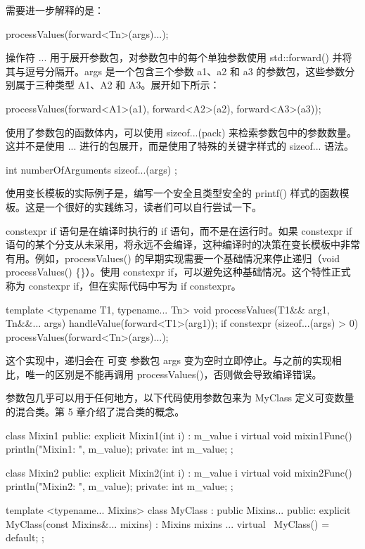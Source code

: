 需要进一步解释的是：

\begin{cpp}
processValues(forward<Tn>(args)...);
\end{cpp}

操作符 ... 用于展开参数包，对参数包中的每个单独参数使用 std::forward() 并将其与逗号分隔开。args 是一个包含三个参数 a1、a2 和 a3 的参数包，这些参数分别属于三种类型 A1、A2 和 A3。展开如下所示：

\begin{cpp}
processValues(forward<A1>(a1),
              forward<A2>(a2),
              forward<A3>(a3));
\end{cpp}

使用了参数包的函数体内，可以使用 sizeof...(pack) 来检索参数包中的参数数量。这并不是使用 ... 进行的包展开，而是使用了特殊的关键字样式的 sizeof... 语法。

\begin{cpp}
int numberOfArguments { sizeof...(args) };
\end{cpp}

使用变长模板的实际例子是，编写一个安全且类型安全的 printf() 样式的函数模板。这是一个很好的实践练习，读者们可以自行尝试一下。


constexpr if 语句是在编译时执行的 if 语句，而不是在运行时。如果 constexpr if 语句的某个分支从未采用，将永远不会编译，这种编译时的决策在变长模板中非常有用。例如，processValues() 的早期实现需要一个基础情况来停止递归（void processValues() \{\}）。使用 constexpr if，可以避免这种基础情况。这个特性正式称为 constexpr if，但在实际代码中写为 if constexpr。

\begin{cpp}
template <typename T1, typename... Tn>
void processValues(T1&& arg1, Tn&&... args)
{
    handleValue(forward<T1>(arg1));
    if constexpr (sizeof...(args) > 0) {
        processValues(forward<Tn>(args)...);
    }
}
\end{cpp}

这个实现中，递归会在 可变 参数包 args 变为空时立即停止。与之前的实现相比，唯一的区别是不能再调用 processValues()，否则做会导致编译错误。


参数包几乎可以用于任何地方，以下代码使用参数包来为 MyClass 定义可变数量的混合类。第 5 章介绍了混合类的概念。

\begin{cpp}
class Mixin1
{
    public:
        explicit Mixin1(int i) : m_value { i } {}
        virtual void mixin1Func() { println("Mixin1: {}", m_value); }
    private:
        int m_value;
};

class Mixin2
{
    public:
        explicit Mixin2(int i) : m_value { i } {}
        virtual void mixin2Func() { println("Mixin2: {}", m_value); }
    private:
        int m_value;
};

template <typename... Mixins>
class MyClass : public Mixins...
{
    public:
        explicit MyClass(const Mixins&... mixins) : Mixins { mixins }... {}
        virtual ~MyClass() = default;
};
\end{cpp}


